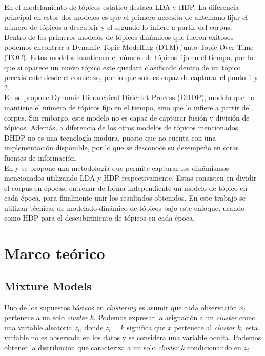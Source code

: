 \documentclass[letterpaper,12pt,oneside]{book} %
\begin{document}
En el modelamiento de tópicos estático destaca LDA y HDP. La diferencia principal en estos dos modelos es que el primero necesita de antemano fijar el número de tópicos a descubrir y el segundo lo infiere a partir del corpus.\\

Dentro de los primeros modelos de tópicos dinámicos que fueron exitosos podemos encontrar a Dynamic Topic Modelling (DTM) junto Topic Over Time (TOC)\citep{wang2006topics}. Estos modelos mantienen el número de tópicos fijo en el tiempo, por lo que si aparece un nuevo tópico este quedará clasificado dentro de un tópico preexistente desde el comienzo, por lo que solo es capaz de capturar el punto 1 y 2.\\

En \citep{ahmed2012timeline} se propone Dynamic Hierarchical Dirichlet Process (DHDP), modelo que no mantiene el número de tópicos fijo en el tiempo, sino que lo infiere a partir del corpus. Sin embargo, este modelo no es capaz de capturar fusión y división de tópicos. Además, a diferencia de los otros modelos de tópicos mencionados, DHDP no es una tecnología madura, puesto que no cuenta con una implementación disponible, por lo que se desconoce su desempeño en otras fuentes de información.\\

En \citep{wilson2011tracking} y \citep{beykikhoshk2018discovering} se propone una metodología que permite capturar los dinámismos mencionados utilizando LDA y HDP respectivamente. Estas consisten en dividir el corpus en épocas, entrenar de forma independiente un modelo de tópico en cada época, para finalmente unir los resultados obtenidos. En este trabajo se utilizan técnicas de modelado dinámico de tópicos bajo este enfoque, usando como HDP para el descubirmiento de tópicos en cada época.


\chapter{Marco teórico}
\section{Mixture Models}
\label{sec:mixture_model}

Uno de los supuestos básicos en \textit{clustering} es asumir que cada observación $x_{i}$ pertenece a un solo \textit{cluster} $k$. Podemos expresar la asignación a un \textit{cluster} como una variable aleatoria $z_{i}$, donde $z_{i}=k$ significa que $x$ pertenece al \textit{cluster} $k$, esta variable no es observada en los datos y se considera una variable oculta. Podemos obtener la distribución que caracteriza a un solo \textit{cluster} $k$ condicionando en $z_{i}$
\end{document}
